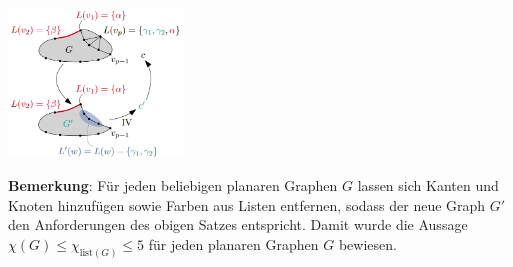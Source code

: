 \begin{itemize}
\begin{itemize}
	\end{itemize}
	\begin{center}
		\includegraphics[width=0.35\textwidth]{images/thom-3.png}
	\end{center}
\end{itemize}

\textbf{Bemerkung}: Für jeden beliebigen planaren Graphen $G$ lassen sich Kanten und Knoten hinzufügen sowie Farben aus Listen entfernen, sodass der neue Graph $G'$ den Anforderungen des obigen Satzes entspricht. Damit wurde die Aussage $\chi(G)\leq\chi_{\text{list}(G)}\leq 5$ für jeden planaren Graphen $G$ bewiesen.

